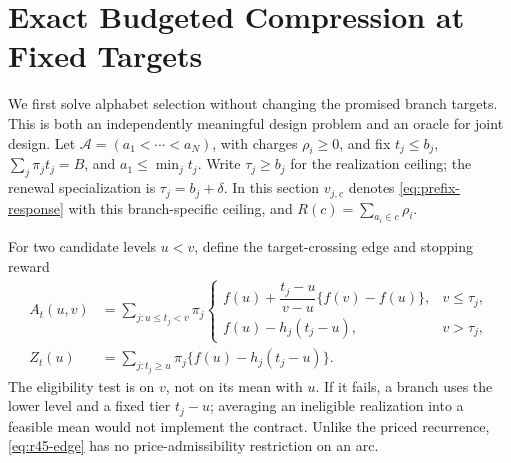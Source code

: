 \section{Exact Budgeted Compression at Fixed Targets}\label{sec:r45-compression}
We first solve alphabet selection without changing the promised branch targets. This is both an independently meaningful design problem and an oracle for joint design. Let $\mathcal A=(a_1<\cdots<a_N)$, with charges $\rho_i\geq0$, and fix $t_j\leq b_j$, $\sum_j\pi_jt_j=B$, and $a_1\leq\min_jt_j$. Write $\tau_j\geq b_j$ for the realization ceiling; the renewal specialization is $\tau_j=b_j+\delta$. In this section $v_{j,c}$ denotes \eqref{eq:prefix-response} with this branch-specific ceiling, and $R(c)=\sum_{a_i\in c}\rho_i$.

For two candidate levels $u<v$, define the target-crossing edge and stopping reward
\begin{align}
 A_t(u,v)&=\sum_{j:u\leq t_j<v}\pi_j
 \begin{cases}
 f(u)+\dfrac{t_j-u}{v-u}\{f(v)-f(u)\},&v\leq\tau_j,\\
 f(u)-h_j(t_j-u),&v>\tau_j,
 \end{cases}\label{eq:r45-edge}\\
 Z_t(u)&=\sum_{j:t_j\geq u}\pi_j\{f(u)-h_j(t_j-u)\}.\label{eq:r45-tail}
\end{align}
The eligibility test is on $v$, not on its mean with $u$. If it fails, a branch uses the lower level and a fixed tier $t_j-u$; averaging an ineligible realization into a feasible mean would not implement the contract. Unlike the priced recurrence, \eqref{eq:r45-edge} has no price-admissibility restriction on an arc.

